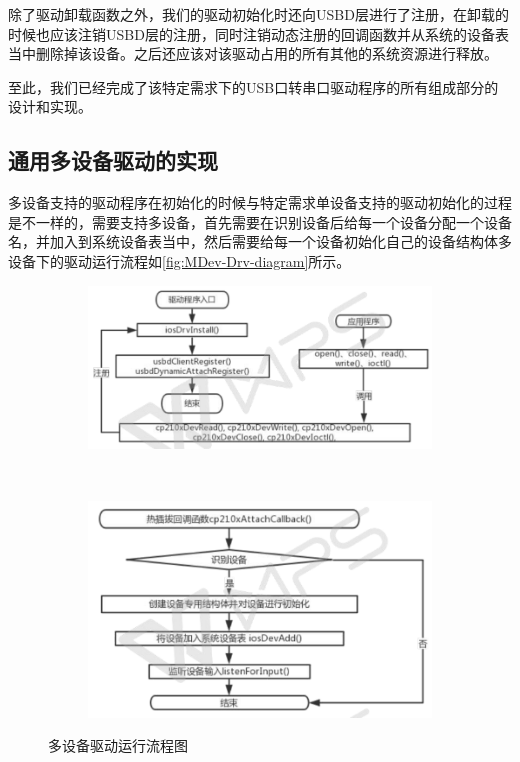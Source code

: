 除了驱动卸载函数之外，我们的驱动初始化时还向USBD层进行了注册，在卸载的时候也应该注销USBD层的注册，同时注销动态注册的回调函数并从系统的设备表当中删除掉该设备。之后还应该对该驱动占用的所有其他的系统资源进行释放。

至此，我们已经完成了该特定需求下的USB口转串口驱动程序的所有组成部分的设计和实现。

\subsection{通用多设备驱动的实现}
多设备支持的驱动程序在初始化的时候与特定需求单设备支持的驱动初始化的过程是不一样的，需要支持多设备，首先需要在识别设备后给每一个设备分配一个设备名，并加入到系统设备表当中，然后需要给每一个设备初始化自己的设备结构体多设备下的驱动运行流程如\autoref{fig:MDev-Drv-diagram}所示。

\begin{figure}[p, !h]
\centering
  \begin{subfigure}[b]{1.0\textwidth}
  \includegraphics[width=\textwidth]{./graphics/MDev-Drv-Diagram-a.pdf}
  \caption{}\label{fig:MDevice-Driver-diagram-a}
  \end{subfigure}
  ~
  \begin{subfigure}[b]{1.0\textwidth}
  \includegraphics[width=\textwidth]{./graphics/MDev-Drv-Diagram-b.pdf}
  \caption{}\label{fig:MDevice-Driver-diagram-b}
  \end{subfigure}
\caption{多设备驱动运行流程图}\label{fig:MDev-Drv-diagram}
\end{figure}


